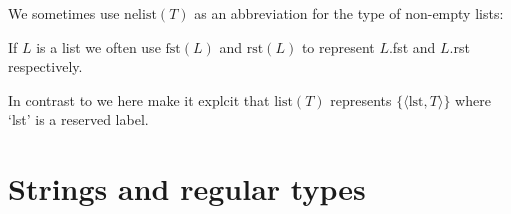  

We sometimes use $\mathrm{nelist}(T)$ as an abbreviation for the type
of non-empty lists:
\begin{quote}
\end{quote}

If
$L$ is a list we often use $\mathrm{fst}(L)$ and $\mathrm{rst}(L)$ to
represent $L$.fst and $L$.rst respectively.

In contrast to \cite{Cooper2012} we here make it explcit that $\mathrm{list}(T)$
represents $\{\langle\mathrm{lst},T\rangle\}$ %
where `lst' %
is a reserved label. 


\section{Strings and regular types}
\label{sec:regular}
\label{app:strings}

 
 

 


